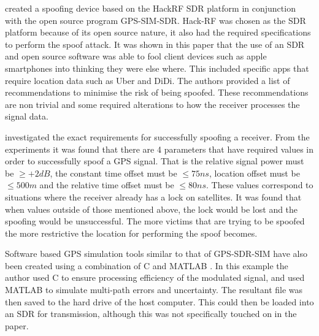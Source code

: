 \textcite{RN28} created a spoofing device based on the HackRF SDR platform in conjunction with the open source program GPS-SIM-SDR. Hack-RF was chosen as the SDR platform
because of its open source nature, it also had the required specifications to perform the spoof attack. It was shown in this paper that the use of an SDR and open source
software was able to fool client devices such as apple smartphones into thinking they were else where. This included specific apps that require location data such as Uber
and DiDi. The authors provided a list of recommendations to minimise the risk of being spoofed. These recommendations are non trivial and some required alterations to how
the receiver processes the signal data.

\textcite{RN30} investigated the exact requirements for successfully spoofing a receiver. From the experiments it was found that there are 4 parameters that have required
values in order to successfully spoof a GPS signal. That is the relative signal power must be $\geq+2dB$, the constant time offset must be $\leq 75ns$, location offset
must be $\leq 500m$ and the relative time offset must be $\leq 80ns$. These values correspond to situations where the receiver already has a lock on satellites. It was
found that when values outside of those mentioned above, the lock would be lost and the spoofing would be unsuccessful. The more victims that are trying to be spoofed the
more restrictive the location for performing the spoof becomes.

Software based GPS simulation tools similar to that of GPS-SDR-SIM have also been created using a combination of C and MATLAB \cite{RN15}. In this example the author used
C to ensure processing efficiency of the modulated signal, and used MATLAB to simulate multi-path errors and uncertainty. The resultant file was then saved to the hard
drive of the host computer. This could then be loaded into an SDR for transmission, although this was not specifically touched on in the paper.


